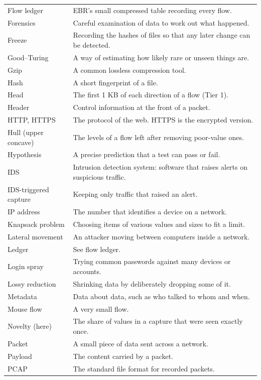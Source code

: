 {\begin{longtable}{>{\raggedright\arraybackslash}p{37mm} >{\raggedright\arraybackslash}p{116mm}}
Flow ledger & EBR's small compressed table recording every flow.\\
Forensics & Careful examination of data to work out what happened.\\
Freeze & Recording the hashes of files so that any later change can be detected.\\
Good--Turing & A way of estimating how likely rare or unseen things are.\\
Gzip & A common lossless compression tool.\\
Hash & A short fingerprint of a file.\\
Head & The first 1 KB of each direction of a flow (Tier 1).\\
Header & Control information at the front of a packet.\\
HTTP, HTTPS & The protocol of the web. HTTPS is the encrypted version.\\
Hull (upper concave) & The levels of a flow left after removing poor-value ones.\\
Hypothesis & A precise prediction that a test can pass or fail.\\
IDS & Intrusion detection system: software that raises alerts on suspicious traffic.\\
IDS-triggered capture & Keeping only traffic that raised an alert.\\
IP address & The number that identifies a device on a network.\\
Knapsack problem & Choosing items of various values and sizes to fit a limit.\\
Lateral movement & An attacker moving between computers inside a network.\\
Ledger & See flow ledger.\\
Login spray & Trying common passwords against many devices or accounts.\\
Lossy reduction & Shrinking data by deliberately dropping some of it.\\
Metadata & Data about data, such as who talked to whom and when.\\
Mouse flow & A very small flow.\\
Novelty (here) & The share of values in a capture that were seen exactly once.\\
Packet & A small piece of data sent across a network.\\
Payload & The content carried by a packet.\\
PCAP & The standard file format for recorded packets.\\

\end{longtable}}
